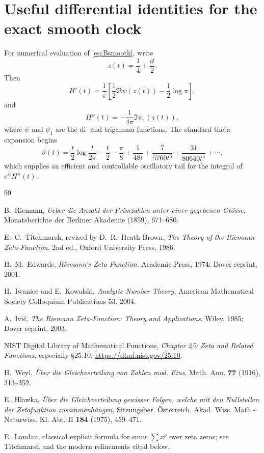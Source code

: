 \documentclass[11pt]{article}
\theoremstyle{definition}
\theoremstyle{remark}
\begin{document}
\section{Useful differential identities for the exact smooth clock}
For numerical evaluation of \eqref{eq:Bsmooth}, write
\[
z(t)=\frac14+\frac{it}{2}.
\]
Then
\[
H'(t)=\frac1\pi\left[
\frac12\Re\psi(z(t))-\frac12\log\pi
\right],
\]
and
\[
H''(t)=-\frac1{4\pi}\Im\psi_1(z(t)),
\]
where $\psi$ and $\psi_1$ are the di- and trigamma functions.  The standard theta expansion begins
\[
\vartheta(t)=\frac t2\log\frac{t}{2\pi}-\frac t2-\frac\pi8
+\frac1{48t}+\frac7{5760t^3}+\frac{31}{80640t^5}+\cdots,
\]
which supplies an efficient and controllable oscillatory tail for the integral of $e^{it}H''(t)$.

\begin{thebibliography}{99}

B.~Riemann,
\emph{Ueber die Anzahl der Primzahlen unter einer gegebenen Grösse},
Monatsberichte der Berliner Akademie (1859), 671--680.

E.~C.~Titchmarsh, revised by D.~R.~Heath-Brown,
\emph{The Theory of the Riemann Zeta-Function}, 2nd ed.,
Oxford University Press, 1986.

H.~M.~Edwards,
\emph{Riemann's Zeta Function},
Academic Press, 1974; Dover reprint, 2001.

H.~Iwaniec and E.~Kowalski,
\emph{Analytic Number Theory},
American Mathematical Society Colloquium Publications 53, 2004.

A.~Ivić,
\emph{The Riemann Zeta-Function: Theory and Applications},
Wiley, 1985; Dover reprint, 2003.

NIST Digital Library of Mathematical Functions,
\emph{Chapter 25: Zeta and Related Functions}, especially \S25.10,
\url{https://dlmf.nist.gov/25.10}.

H.~Weyl,
\emph{Über die Gleichverteilung von Zahlen mod. Eins},
Math. Ann. \textbf{77} (1916), 313--352.

E.~Hlawka,
\emph{Über die Gleichverteilung gewisser Folgen, welche mit den Nullstellen der Zetafunktion zusammenhängen},
Sitzungsber. Österreich. Akad. Wiss. Math.-Naturwiss. Kl. Abt. II \textbf{184} (1975), 459--471.

E.~Landau,
classical explicit formula for sums $\sum x^\rho$ over zeta zeros;
see Titchmarsh \cite{Titchmarsh1986} and the modern refinements cited below.


\end{thebibliography}
\end{document}
